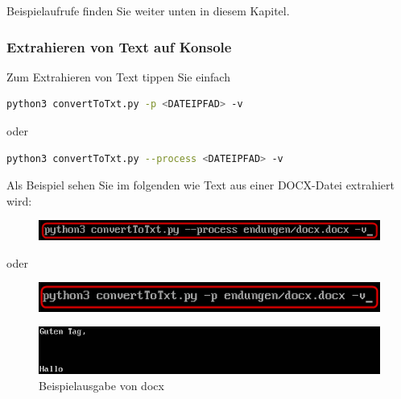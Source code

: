 \documentclass[12pt]{scrartcl}
\begin{document}
Beispielaufrufe finden Sie weiter unten in diesem Kapitel. 
\newpage
\subsubsection{Extrahieren von Text auf Konsole}
\label{sec:first-steps-extraction-console}
Zum Extrahieren von Text tippen Sie einfach	

\begin{lstlisting}[language=bash]
python3 convertToTxt.py -p <DATEIPFAD> -v 
\end{lstlisting}\begin{center}
oder 
\end{center}
\begin{lstlisting}[language=bash]
python3 convertToTxt.py --process <DATEIPFAD> -v
\end{lstlisting}
Als Beispiel sehen Sie im folgenden wie Text aus einer DOCX-Datei extrahiert wird:
\begin{figure}[htbp]
\includegraphics[width=1.0\textwidth]{ersteSchritteExtract001}\par\vspace{0.25cm}
\label{fig:ersteSchritteExtract001}
\end{figure}
\begin{center}
oder
\end{center}
\begin{figure}[htbp]
\includegraphics[width=1.0\textwidth]{ersteSchritteExtract002}\par\vspace{0.25cm}
\label{fig:ersteSchritteExtract002}
\end{figure}
\begin{figure}[htbp]
\includegraphics[width=1.0\textwidth]{ersteSchritteExtract003}\par\vspace{0.25cm}
\caption{Beispielausgabe von docx}
\label{fig:ersteSchritteExtract003}
\end{figure}
\newpage
\end{document}
